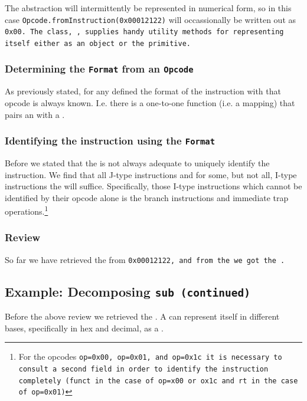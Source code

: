 The \opcodem abstraction will intermittently be represented in
numerical form, so in this
case \texttt{Opcode.fromInstruction(0x00012122)} will
occassionally be written out as \tt{0x00}. The class, \opcodem,
supplies handy utility methods for representing itself either as an
object or the  primitive.

\subsubsection{Determining the \texttt{Format} from an \texttt{Opcode}}

As previously stated, for any defined \opcodem the format of the
instruction with that opcode is always known. I.e. there is a
one-to-one function (i.e. a mapping) that pairs an  with
a .



\subsubsection{Identifying the instruction using the \texttt{Format}}

Before we stated that the \opcode is not always adequate to uniquely
identify the instruction. We find that all J-type instructions and for
some, but not all, I-type instructions the \opcode will suffice.
Specifically, those I-type instructions which cannot be identified by
their opcode alone is the branch instructions and immediate trap
operations.\footnote{For the opcodes \tt{op=0x00}, \tt{op=0x01},
and \tt{op=0x1c} it is necessary to consult a second field in order to
identify the instruction completely (\tt{funct} in the case
of \tt{op=x00} or \tt{ox1c} and
\tt{rt} in the case of \tt{op=0x01})}

\subsubsection{Review}

So far we have retrieved the \opcodem from \tt{0x00012122}, and from
the
\opcodem we got the \formatm.


\subsection{Example: Decomposing \tt{sub} (continued)}

Before the above review we retrieved the \decomposedm. A \decomposedm
can represent itself in different bases, specifically in hex and decimal,
as a .

